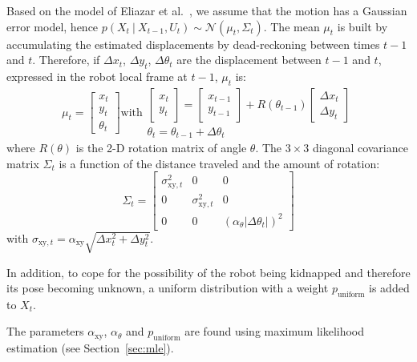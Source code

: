 \documentclass[letterpaper, 10pt, conference]{ieeeconf}
\newcommand{\sect}[1]{Section~\ref{sec:#1}}
\begin{document}
Based on the model of Eliazar et al.~\cite{eliazar2004motionmodel}, we assume that the motion has a Gaussian error model, hence $p(X_t~|~X_{t-1}, U_{t})\sim\mathcal{N}(\mu_t,\Sigma_t)$.
The mean $\mu_t$ is built by accumulating the estimated displacements by dead-reckoning between times $t-1$ and $t$.
Therefore, if $\Delta x_t$, $\Delta y_t$, $\Delta \theta_t$ are the displacement between $t-1$ and $t$, expressed in the robot local frame at $t-1$, $\mu_t$ is:
\begin{equation*}
\mu_t =
\left[ \begin{array}{c} x_t \\ y_t \\ \theta_t \end{array} \right]
\text{with}
\begin{array}{c}
\left[ \begin{array}{c} x_t \\ y_t \end{array} \right] =
\left[ \begin{array}{c} x_{t-1} \\ y_{t-1} \end{array} \right] +
R(\theta_{t-1})
\left[ \begin{array}{c} \Delta x_{t} \\ \Delta y_{t} \end{array} \right]
\\
\theta_t = \theta_{t-1} + \Delta \theta_t
\end{array}
\end{equation*}
where $R(\theta)$ is the 2-D rotation matrix of angle $\theta$.
The $3\times3$ diagonal covariance matrix $\Sigma_t$ is a function of the distance traveled and the amount of rotation:
\begin{equation*}
\Sigma_t=\begin{bmatrix} \sigma_{\mathrm{xy},t}^2 & 0 & 0 \\ 0 & \sigma_{\mathrm{xy},t}^2 & 0 \\ 0 & 0 & (\alpha_\theta | \Delta \theta_t |)^2 \end{bmatrix}
\end{equation*}
with $ \sigma_{\mathrm{xy},t} = \alpha_\mathrm{xy} \sqrt{\Delta x_{t}^2 + \Delta y_{t}^2}$.

In addition, to cope for the possibility of the robot being kidnapped and therefore its pose becoming unknown, a uniform distribution with a weight $p_\mathrm{uniform}$ is added to $X_t$.

The parameters $\alpha_\mathrm{xy}$, $\alpha_\theta$ and $p_\mathrm{uniform}$ are found using maximum likelihood estimation (see \sect{mle}).
\end{document}
